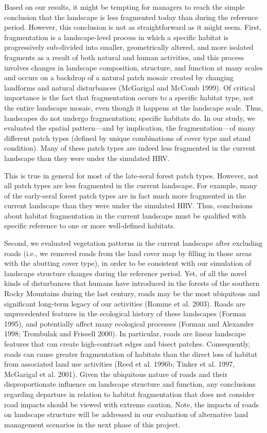 Based on our results, it might be tempting for managers to reach the simple conclusion that the landscape is less fragmented today than during the reference period. However, this conclusion is not as straightforward as it might seem. First, fragmentation is a landscape-level process in which a specific habitat is progressively sub-divided into smaller, geometrically altered, and more isolated fragments as a result of both natural and human activities, and this process involves changes in landscape composition, structure, and function at many scales and occurs on a backdrop of a natural patch mosaic created by changing landforms and natural disturbances (McGarigal and McComb 1999). Of critical importance is the fact that fragmentation occurs to a specific habitat type, not the entire landscape mosaic, even though it happens at the landscape scale. Thus, landscapes do not undergo fragmentation; specific habitats do. In our study, we evaluated the spatial pattern---and by implication, the fragmentation---of many different patch types (defined by unique combinations of cover type and stand condition). Many of these patch types are indeed less fragmented in the current landscape than they were under the simulated HRV. 

This is true in general for most of the late-seral forest patch types. However, not all patch types are less fragmented in the current landscape. For example, many of the early-seral forest patch types are in fact much more fragmented in the current landscape than they were under the simulated HRV. Thus, conclusions about habitat fragmentation in the current landscape must be qualified with specific reference to one or more well-defined habitats.

Second, we evaluated vegetation patterns in the current landscape after excluding roads (i.e., we removed roads from the land cover map by filling in those areas with the abutting cover type), in order to be consistent with our simulation of landscape structure changes during the reference period. Yet, of all the novel kinds of disturbances that humans have introduced in the forests of the southern Rocky Mountains during the last century, roads may be the most ubiquitous and significant long-term legacy of our activities (Romme et al. 2003). Roads are unprecedented features in the ecological history of these landscapes (Forman 1995), and potentially affect many ecological processes (Forman and Alexander 1998; Trombulak and Frissell 2000). In particular, roads are linear landscape features that can create high-contrast edges and bisect patches. Consequently, roads can cause greater fragmentation of habitats than the direct loss of habitat from associated land use activities (Reed et al. 1996b; Tinker et al. 1997, McGarigal et al. 2001). Given the ubiquitous nature of roads and their disproportionate influence on landscape structure and function, any conclusions regarding departure in relation to habitat fragmentation that does not consider road impacts should be viewed with extreme caution. Note, the impacts of roads on landscape structure will be addressed in our evaluation of alternative land management scenarios in the next phase of this project.

